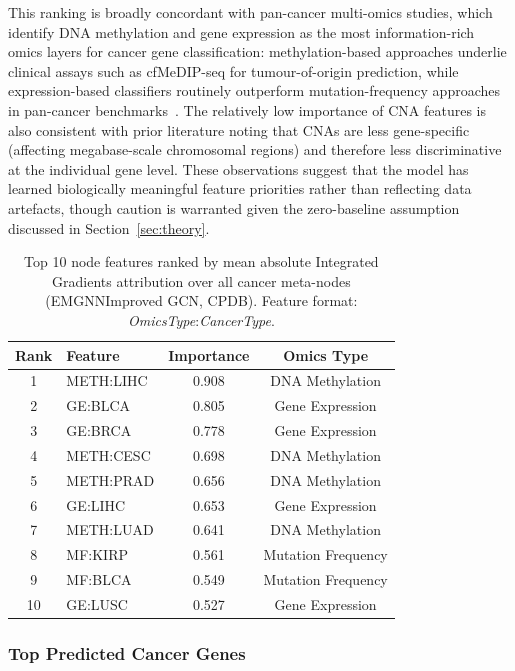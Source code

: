 This ranking is broadly concordant with pan-cancer multi-omics studies, which identify
DNA methylation and gene expression as the most information-rich omics layers for cancer
gene classification: methylation-based approaches underlie clinical assays such as
cfMeDIP-seq for tumour-of-origin prediction, while expression-based classifiers routinely
outperform mutation-frequency approaches in pan-cancer benchmarks~\cite{emogi2021}.
The relatively low importance of CNA features is also consistent with prior literature
noting that CNAs are less gene-specific (affecting megabase-scale chromosomal regions)
and therefore less discriminative at the individual gene level. These observations suggest
that the model has learned biologically meaningful feature priorities rather than
reflecting data artefacts, though caution is warranted given the zero-baseline assumption
discussed in Section~\ref{sec:theory}.

\begin{table}[ht]
  \centering
  \caption{Top 10 node features ranked by mean absolute Integrated Gradients attribution
           over all cancer meta-nodes (EMGNNImproved GCN, CPDB). Feature format:
           \textit{OmicsType}:\textit{CancerType}.}
  \label{tab:featimp}
  \small
  \begin{tabular}{clcc}
    \toprule
    \textbf{Rank} & \textbf{Feature} & \textbf{Importance} & \textbf{Omics Type} \\
    \midrule
     1 & METH:LIHC & 0.908 & DNA Methylation \\
     2 & GE:BLCA   & 0.805 & Gene Expression \\
     3 & GE:BRCA   & 0.778 & Gene Expression \\
     4 & METH:CESC & 0.698 & DNA Methylation \\
     5 & METH:PRAD & 0.656 & DNA Methylation \\
     6 & GE:LIHC   & 0.653 & Gene Expression \\
     7 & METH:LUAD & 0.641 & DNA Methylation \\
     8 & MF:KIRP   & 0.561 & Mutation Frequency \\
     9 & MF:BLCA   & 0.549 & Mutation Frequency \\
    10 & GE:LUSC   & 0.527 & Gene Expression \\
    \bottomrule
  \end{tabular}
\end{table}

\subsubsection{Top Predicted Cancer Genes}


